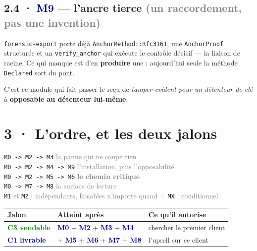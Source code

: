 \documentclass[10pt]{article}
\newcommand{\best}[1]{\textcolor{green}{\textbf{#1}}}
\newcommand{\sz}[1]{\textcolor{grey}{\small\textsf{#1}}}
\newcommand{\code}[1]{\texttt{\small #1}}
\newcommand{\mm}[1]{\textbf{\textcolor{navy}{#1}}}
\begin{document}
\subsection{2.4 · \mm{M9} --- l'ancre tierce \sz{(un raccordement, pas une invention)}}

\code{forensic-export} porte déjà \code{AnchorMethod::Rfc3161}, une \code{AnchorProof} structurée et
un \code{verify\_anchor} qui exécute le contrôle décisif --- la liaison de racine. Ce qui manque est
d'en \textbf{produire} une : aujourd'hui seule la méthode \code{Declared} sort du pont.

C'est ce module qui fait passer le reçu de \emph{tamper-evident pour un détenteur de clé} à
\textbf{opposable au détenteur lui-même}.

\section{3 · L'ordre, et les deux jalons}

\begin{extrait}
\small
\code{M0 -> M2 -> M3} \hfill \sz{la panne qui ne coupe rien} \\
\code{M0 -> M2 -> M4 -> M9} \hfill \sz{l'installation, puis l'opposabilité} \\
\code{M0 -> M2 -> M5 -> M6} \hfill \sz{\textbf{le chemin critique}} \\
\code{M0 -> M7 -> M8} \hfill \sz{la surface de lecture} \\[3pt]
\code{M1} \sz{et} \code{MZ} \sz{: indépendants, faisables n'importe quand \quad ·\quad}
\code{MX} \sz{: conditionnel}
\end{extrait}

\begin{center}\small
\renewcommand{\arraystretch}{1.25}
\begin{tabular}{@{}>{\raggedright\arraybackslash}p{4.6cm} >{\raggedright\arraybackslash}p{5.0cm} >{\raggedright\arraybackslash}p{6.0cm}@{}}
\toprule
\textbf{Jalon} & \textbf{Atteint après} & \textbf{Ce qu'il autorise} \\
\midrule
\best{C3 vendable} & \mm{M0} $+$ \mm{M2} $+$ \mm{M3} $+$ \mm{M4} & chercher le premier client \\
\textcolor{navy}{\textbf{C1 livrable}} & $+$ \mm{M5} $+$ \mm{M6} $+$ \mm{M7} $+$ \mm{M8} & l'upsell sur ce client \\
\bottomrule
\end{tabular}
\end{center}
\end{document}
